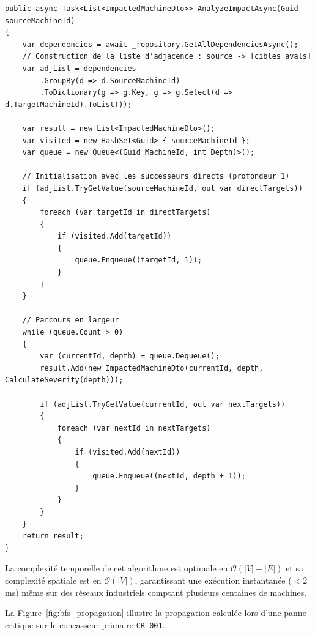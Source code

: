 \begin{lstlisting}[language=CSharpCustom, caption={Algorithme BFS d'analyse de propagation d'impact en C\#}]
public async Task<List<ImpactedMachineDto>> AnalyzeImpactAsync(Guid sourceMachineId)
{
    var dependencies = await _repository.GetAllDependenciesAsync();
    // Construction de la liste d'adjacence : source -> [cibles avals]
    var adjList = dependencies
        .GroupBy(d => d.SourceMachineId)
        .ToDictionary(g => g.Key, g => g.Select(d => d.TargetMachineId).ToList());

    var result = new List<ImpactedMachineDto>();
    var visited = new HashSet<Guid> { sourceMachineId };
    var queue = new Queue<(Guid MachineId, int Depth)>();

    // Initialisation avec les successeurs directs (profondeur 1)
    if (adjList.TryGetValue(sourceMachineId, out var directTargets))
    {
        foreach (var targetId in directTargets)
        {
            if (visited.Add(targetId))
            {
                queue.Enqueue((targetId, 1));
            }
        }
    }

    // Parcours en largeur
    while (queue.Count > 0)
    {
        var (currentId, depth) = queue.Dequeue();
        result.Add(new ImpactedMachineDto(currentId, depth, CalculateSeverity(depth)));

        if (adjList.TryGetValue(currentId, out var nextTargets))
        {
            foreach (var nextId in nextTargets)
            {
                if (visited.Add(nextId))
                {
                    queue.Enqueue((nextId, depth + 1));
                }
            }
        }
    }
    return result;
}
\end{lstlisting}

La complexité temporelle de cet algorithme est optimale en $\mathcal{O}(|V| + |E|)$ et sa complexité spatiale est en $\mathcal{O}(|V|)$, garantissant une exécution instantanée ($< 2$\,ms) même sur des réseaux industriels comptant plusieurs centaines de machines.

La Figure~\ref{fig:bfs_propagation} illustre la propagation calculée lors d'une panne critique sur le concasseur primaire \texttt{CR-001}.


